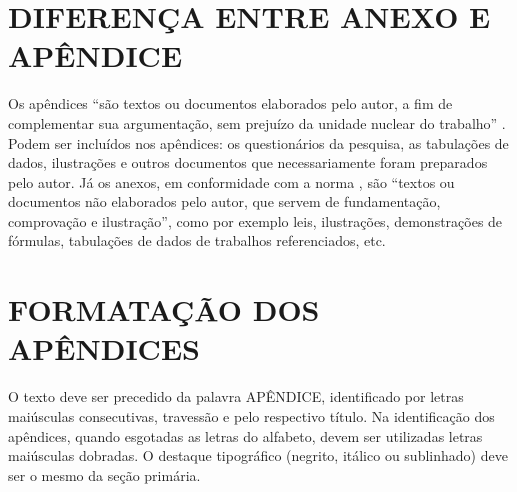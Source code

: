 \begin{apendicesenv}

  \chapter[Diferença entre Anexo e Apêndice]{DIFERENÇA ENTRE ANEXO E APÊNDICE} \label{apen:a}
  Os apêndices ``são textos ou documentos elaborados pelo autor, a fim de complementar sua argumentação, sem
  prejuízo da unidade nuclear do trabalho'' \cite{NBR14724:2024}. Podem ser incluídos nos apêndices:
  os questionários da pesquisa, as tabulações de dados, ilustrações e outros documentos que necessariamente
  foram preparados pelo autor. Já os anexos, em conformidade com a norma \cite{NBR14724:2024}, são
  ``textos ou documentos não elaborados pelo autor, que servem de fundamentação, comprovação e ilustração'',
  como por exemplo leis, ilustrações, demonstrações de fórmulas, tabulações de dados de trabalhos referenciados,
  etc.

  \chapter[Formatação dos Apêndices]{FORMATAÇÃO DOS APÊNDICES} \label{apen:b}
  O texto deve ser precedido da palavra APÊNDICE, identificado por letras maiúsculas consecutivas,
  travessão e pelo respectivo título. Na identificação dos apêndices, quando esgotadas as letras do
  alfabeto, devem ser utilizadas letras maiúsculas dobradas. O destaque tipográfico (negrito, itálico
  ou sublinhado) deve ser o mesmo da seção primária. \cite{NBR14724:2024}
\end{apendicesenv}